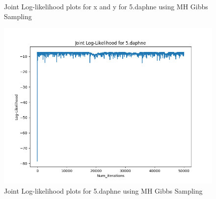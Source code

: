\documentclass{article}
\begin{document}
\begin{enumerate}
\begin{enumerate}
\begin{figure}[!htp] 
    \centering
    \hfill%
        \caption{Joint Log-likelihood plots for x and y for 5.daphne using MH Gibbs Sampling}
\end{figure}

\begin{figure}[!ht]
	\centering
	\includegraphics[scale=0.5]{../figs/Gibbs/joint_log_likelihood_5_daphne}
	\caption{Joint Log-likelihood plots for 5.daphne using MH Gibbs Sampling}
\end{figure}


\end{enumerate}
\end{enumerate}
\end{document}
